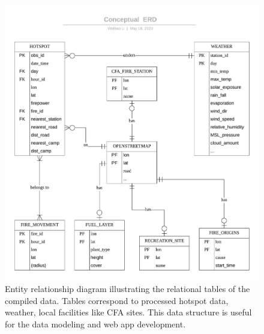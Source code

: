 \documentclass[11pt,a4paper,]{article}
\begin{document}
\begin{figure}
\centering
\includegraphics{figures/Shiny_app_data_Conceptual_ERD.jpeg}
\caption{Entity relationship diagram illustrating the relational tables
of the compiled data. Tables correspond to processed hotspot data,
weather, local facilities like CFA sites. This data structure is useful
for the data modeling and web app development. \label{fig:ERD}}
\end{figure}
\end{document}
